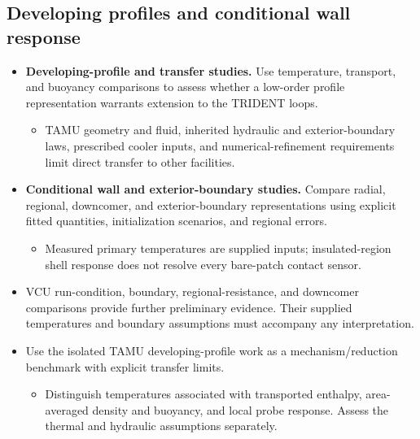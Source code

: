 \subsection{Developing profiles and conditional wall response}\label{subsec:developing-profiles-and-conditional-wall-response}
\begin{itemize}[leftmargin=*]
\item {}\textbf{Developing-profile and transfer studies.} Use temperature, transport, and buoyancy comparisons to assess whether a low-order profile representation warrants extension to the TRIDENT loops.
\begin{itemize}
\item TAMU geometry and fluid, inherited hydraulic and exterior-boundary laws, prescribed cooler inputs, and numerical-refinement requirements limit direct transfer to other facilities.
\end{itemize}

\item {}\textbf{Conditional wall and exterior-boundary studies.} Compare radial, regional, downcomer, and exterior-boundary representations using explicit fitted quantities, initialization scenarios, and regional errors.
\begin{itemize}
\item Measured primary temperatures are supplied inputs; insulated-region shell response does not resolve every bare-patch contact sensor.
\end{itemize}

\item VCU run-condition, boundary, regional-resistance, and downcomer comparisons provide further preliminary evidence. Their supplied temperatures and boundary assumptions must accompany any interpretation.
\item Use the isolated TAMU developing-profile work as a mechanism/\allowbreak{}reduction benchmark with explicit transfer limits.
\begin{itemize}
\item Distinguish temperatures associated with transported enthalpy, area-averaged density and buoyancy, and local probe response. Assess the thermal and hydraulic assumptions separately.
\end{itemize}
\end{itemize}
